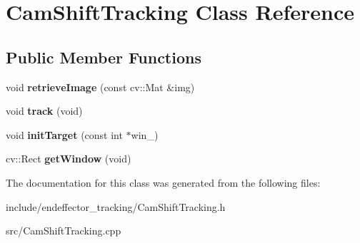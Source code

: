 \hypertarget{classCamShiftTracking}{\section{\-Cam\-Shift\-Tracking \-Class \-Reference}
\label{classCamShiftTracking}
}
\subsection*{\-Public \-Member \-Functions}
\begin{DoxyCompactItemize}
\item 
\hypertarget{classCamShiftTracking_ae20d6c7a9c970746bad1252d94c3aced}{void {\bfseries retrieve\-Image} (const cv\-::\-Mat \&img)}\label{classCamShiftTracking_ae20d6c7a9c970746bad1252d94c3aced}

\item 
\hypertarget{classCamShiftTracking_a95ec38264ba0f6ff96c31d5e41e04e7b}{void {\bfseries track} (void)}\label{classCamShiftTracking_a95ec38264ba0f6ff96c31d5e41e04e7b}

\item 
\hypertarget{classCamShiftTracking_a893fa96024540fcaa87a080d0ff75e25}{void {\bfseries init\-Target} (const int $\ast$win\-\_\-)}\label{classCamShiftTracking_a893fa96024540fcaa87a080d0ff75e25}

\item 
\hypertarget{classCamShiftTracking_a2b71a90a040bfa8bfae51dbff04b32f4}{cv\-::\-Rect {\bfseries get\-Window} (void)}\label{classCamShiftTracking_a2b71a90a040bfa8bfae51dbff04b32f4}

\end{DoxyCompactItemize}


\-The documentation for this class was generated from the following files\-:\begin{DoxyCompactItemize}
\item 
include/endeffector\-\_\-tracking/\-Cam\-Shift\-Tracking.\-h\item 
src/\-Cam\-Shift\-Tracking.\-cpp\end{DoxyCompactItemize}
